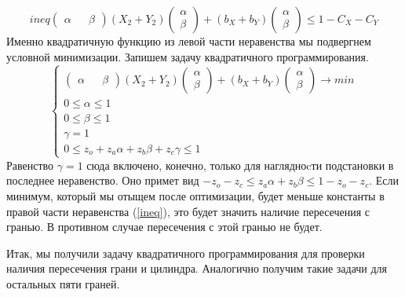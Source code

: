 \documentclass[pdftex,ptm,12pt,a4paper]{report}
\begin{document}
\begin{enumerate}
      \begin{equation}{ineq}
            \begin{pmatrix} \alpha && \beta \end{pmatrix}
               (X_2 + Y_2)
             \begin{pmatrix} \alpha \\ \beta \end{pmatrix} +
             (b_X + b_Y) \begin{pmatrix} \alpha \\ \beta \end{pmatrix}  \le
             1 - C_X -C_Y        
      \end{equation}
      Именно квадратичную функцию из левой части неравенства мы подвергнем условной минимизации.
      Запишем задачу квадратичного программирования.
      \begin{equation}\label{quadrtask}
          \begin{cases}
          \begin{pmatrix} \alpha && \beta \end{pmatrix}
               (X_2 + Y_2)
             \begin{pmatrix} \alpha \\ \beta \end{pmatrix} +
             (b_X + b_Y) \begin{pmatrix} \alpha \\ \beta \end{pmatrix} \to min \\
              0 \le  \alpha   \le  1 \\
              0 \le  \beta   \le  1 \\
              \gamma   =  1 \\
              0 \le  z_o + z_a \alpha + z_b \beta + z_c\gamma   \le  1 
          \end{cases}
      \end{equation}
      Равенство $\gamma = 1$ сюда включено, конечно, только для наглядноcти подстановки в последнее неравенство.
      Оно примет вид $ -z_o - z_c \le  z_a \alpha + z_b \beta \le  1 -z_o - z_c$.
      Если минимум, который мы отыщем после оптимизации, будет меньше константы в правой части неравенства (\ref{ineq}), это будет значить наличие пересечения с гранью. 
      В противном случае пересечения с этой гранью не будет.

      Итак, мы получили задачу квадратичного программирования для проверки наличия пересечения грани и цилиндра. 
      Аналогично получим такие задачи для остальных пяти граней.

\end{enumerate}
\end{document}
